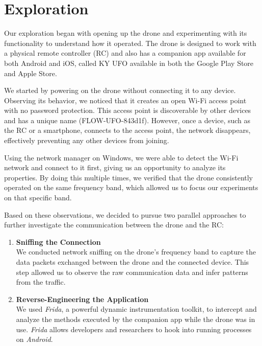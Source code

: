 \section{Exploration}
Our exploration began with opening up the drone and experimenting with its functionality to understand how it operated. The drone is designed to work with a physical remote controller (RC) and also has a companion app available for both Android and iOS, called KY UFO available in both the Google Play Store and Apple Store.

We started by powering on the drone without connecting it to any device. Observing its behavior, we noticed that it creates an open Wi-Fi access point with no password protection. This access point is discoverable by other devices and has a unique name (FLOW-UFO-843d1f). However, once a device, such as the RC or a smartphone, connects to the access point, the network disappears, effectively preventing any other devices from joining.

Using the network manager on Windows, we were able to detect the Wi-Fi network and connect to it first, giving us an opportunity to analyze its properties. By doing this multiple times, we verified that the drone consistently operated on the same frequency band, which allowed us to focus our experiments on that specific band.

Based on these observations, we decided to pursue two parallel approaches to further investigate the communication between the drone and the RC:
\begin{enumerate}
    \item \textbf{Sniffing the Connection}\\
We conducted network sniffing on the drone's frequency band to capture the data packets exchanged between the drone and the connected device. This step allowed us to observe the raw communication data and infer patterns from the traffic.
    \item \textbf{Reverse-Engineering the Application}\\
We used \textit{Frida}, a powerful dynamic instrumentation toolkit, to intercept and analyze the methods executed by the companion app while the drone was in use. \textit{Frida} allows developers and researchers to hook into running processes on \textit{Android}.
\end{enumerate}